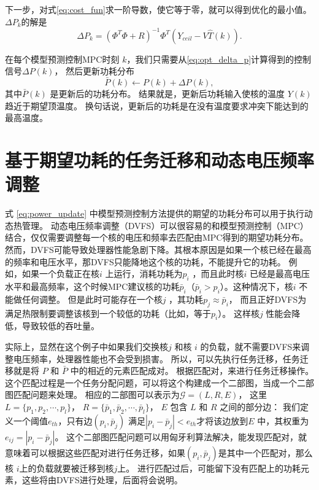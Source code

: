 下一步，对式\eqref{eq:cost_fun}求一阶导数，使它等于零，就可以得到优化的最小值。
$\Delta P_k$的解是
\begin{equation}\label{eq:opt_delta_p}
\Delta P_k = (\Phi^T \Phi + R)^{-1}\Phi^T(Y_{ceil}-V\hat{T}(k)).
\end{equation}

在每个模型预测控制MPC时刻 $k$，我们只需要从\eqref{eq:opt_delta_p}计算得到的控制信号$\Delta P(k)$， 
然后更新功耗分布
\begin{equation}\label{eq:power_update}
\bar{P}(k) \gets P(k) + \Delta P(k),
\end{equation}
其中$\bar{P}(k)$  是更新后的功耗分布。
结果就是，更新后功耗输入使核的温度 $Y(k)$ 趋近于期望顶温度。
换句话说，更新后的功耗是在没有温度要求冲突下能达到的最高温度。

\section{基于期望功耗的任务迁移和动态电压频率调整}\label{sec:dtm_mpc}

式 \eqref{eq:power_update} 中模型预测控制方法提供的期望的功耗分布可以用于执行动态热管理。
动态电压频率调整（DVFS）可以很容易的和模型预测控制（MPC）结合，仅仅需要调整每一个核的电压和频率去匹配由MPC得到的期望功耗分布。
然而，DVFS可能导致处理器性能急剧下降。其根本原因是如果一个核已经在最高的频率和电压水平，那DVFS只能降地这个核的功耗，不能提升它的功耗。
例如，如果一个负载正在核$i$ 上运行，消耗功耗为$p_i$ ，而且此时核$i$ 已经是最高电压水平和最高频率，这个时候MPC建议核的功耗$\bar{p}_i$（$\bar{p}_i>p_i$）。这种情况下，核$i$ 不能做任何调整。
但是此时可能存在一个核$j$ ，其功耗$p_j \approx \bar{p}_i$， 而且正好DVFS为满足热限制要调整该核到一个较低的功耗（比如，等于$p_i$）。
这样核$j$ 性能会降低，导致较低的吞吐量。

实际上，显然在这个例子中如果我们交换核$j$ 和核 $i$ 的负载，就不需要DVFS来调整电压频率，处理器性能也不会受到损害。
所以，可以先执行任务迁移，任务迁移就是将 $P$ 和 $\bar{P}$ 中的相近的元素匹配成对。
根据匹配对，来进行任务迁移操作。
这个匹配过程是一个任务分配问题，可以将这个构建成一个二部图，当成一个二部图匹配问题来处理。
相应的二部图可以表示为$\mathcal{G} = (L, R, E)$，
这里 $L = \{p_1, p_2, \cdots, p_l\}$， $R = \{\bar{p}_1,
\bar{p}_2,\cdots, \bar{p}_l\}$，
 $E$ 包含 $L$ 和 $R$ 之间的部分边：
 我们定义一个阈值$e_{th}$，只有边$(p_i, \bar{p}_j)$ 满足$|p_i-\bar{p}_j|<e_{th}$才将该边放到$E$ 中，其权重为$e_{ij} = |p_i-\bar{p}_j|$。
 这个二部图匹配问题可以用匈牙利算法解决，能发现匹配对，就意味着可以根据这些匹配对进行任务迁移，如果$(p_i, \bar{p}_j)$是其中一个匹配对，那么核 $i$上的负载就要被迁移到核$j$上。
 进行匹配过后，可能留下没有匹配上的功耗元素，这些将由DVFS进行处理，后面将会说明。
 
